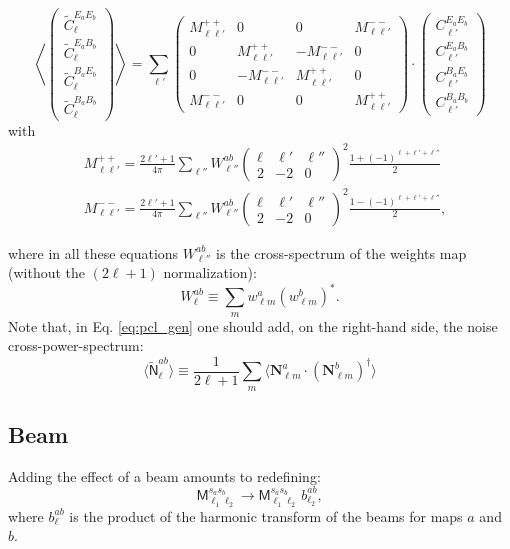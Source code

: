 \documentclass[a4paper,10pt]{article}
\newcommand{\wtj}[6]{\left(\begin{array}{ccc} #1 & #2 & #3\\#4 & #5 & #6\end{array} \right)}
\begin{document}
\begin{itemize}
\begin{equation}
   \left\langle\left(\begin{array}{c}
                \tilde{C}^{E_aE_b}_\ell \\ \tilde{C}^{E_aB_b}_\ell \\ \tilde{C}^{B_aE_b}_\ell \\ \tilde{C}^{B_aB_b}_\ell
               \end{array}\right)\right\rangle
   =\sum_{\ell'}\left(
   \begin{array}{llll}
    M^{++}_{\ell\ell'} & 0 & 0 & M^{--}_{\ell\ell'}\\
    0 & M^{++}_{\ell\ell'} & -M^{--}_{\ell\ell'} & 0\\
    0 & -M^{--}_{\ell\ell'} & M^{++}_{\ell\ell'} & 0\\
    M^{--}_{\ell\ell'} & 0 & 0 & M^{++}_{\ell\ell'}
   \end{array}\right)\cdot\left(
   \begin{array}{c}
    C^{E_aE_b}_{\ell'}\\ C^{E_aB_b}_{\ell'} \\ C^{B_aE_b}_{\ell'}\\ C^{B_aB_b}_{\ell'}
   \end{array}\right)
 \end{equation}
 with
 \begin{align}
  &M^{++}_{\ell\ell'}=\frac{2\ell'+1}{4\pi}\sum_{\ell''}W^{ab}_{\ell''}\wtj{\ell}{\ell'}{\ell''}{2}{-2}{0}^2\frac{1+(-1)^{\ell+\ell'+\ell''}}{2}\\
  &M^{--}_{\ell\ell'}=\frac{2\ell'+1}{4\pi}\sum_{\ell''}W^{ab}_{\ell''}\wtj{\ell}{\ell'}{\ell''}{2}{-2}{0}^2\frac{1-(-1)^{\ell+\ell'+\ell''}}{2},
 \end{align}
\end{itemize}
where in all these equations $W^{ab}_{\ell''}$ is the cross-spectrum of the weights map (without the $(2\ell+1)$ normalization):
\begin{equation}
 W^{ab}_\ell\equiv\sum_m w^a_{\ell m}(w^b_{\ell m})^*.
\end{equation}
Note that, in Eq. \ref{eq:pcl_gen} one should add, on the right-hand side, the noise cross-power-spectrum:
\begin{equation}
\langle\tilde{\mathsf{N}}^{ab}_\ell\rangle\equiv\frac{1}{2\ell+1}\sum_m\langle\mathbf{N}^a_{\ell m}\cdot(\mathbf{N}^b_{\ell m})^\dag\rangle 
\end{equation}


\subsection{Beam}
Adding the effect of a beam amounts to redefining:
\begin{equation}
  \mathsf{M}^{s_as_b}_{\ell_1\ell_2}\rightarrow\mathsf{M}^{s_as_b}_{\ell_1\ell_2}\,b^{ab}_{\ell_2},
\end{equation}
where $b^{ab}_\ell$ is the product of the harmonic transform of the beams for maps $a$ and $b$.
\end{document}
